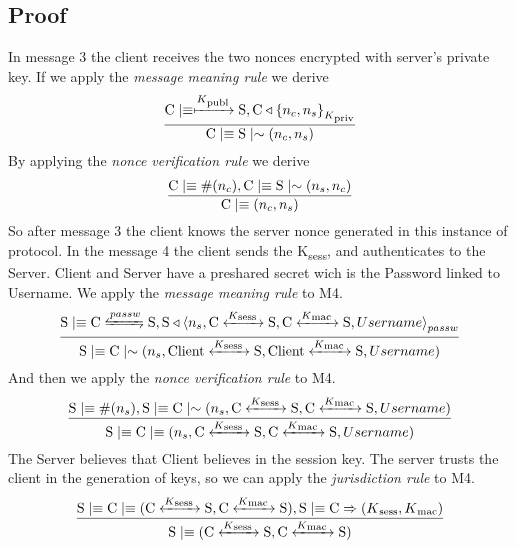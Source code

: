 \subsection{Proof}
In message 3 the client receives the two nonces encrypted with server's private key. If we apply the \textit{message meaning rule} we derive
\[ \frac{\textnormal{C} \mid\equiv \xmapsto{K\textsubscript{publ}} \textnormal{S}, \textnormal{C} \triangleleft { \{ n_c,n_s \} }_{K\textsubscript{priv}}}
        {\textnormal{C} \mid\equiv \textnormal{S} \mid\sim (n_c,n_s)}\]
By applying the \textit{nonce verification rule} we derive
\[ \frac{\textnormal{C} \mid\equiv \#(n_c), \textnormal{C} \mid\equiv \textnormal{S} \mid\sim (n_s,n_c)}{\textnormal{C} \mid\equiv (n_c,n_s)}\]
So after message 3 the client knows the server nonce generated in this instance of protocol. In the message 4 the client sends the K\textsubscript{sess}, and authenticates to the Server. Client and Server have a preshared secret wich is the Password linked to Username. We apply the \textit{message meaning rule} to M4.
\[ \frac{\textnormal{S} \believes \textnormal{C} \secret{passw} \textnormal{S}, \textnormal{S} \sees \combine{n_s,\textnormal{C} \sharekey{K\textsubscript{sess }} \textnormal{S},\textnormal{C} \sharekey{K\textsubscript{mac }} \textnormal{S},Username}{passw}}{\textnormal{S}\believes \textnormal{C} \oncesaid (n_s,\textnormal{Client} \sharekey{K\textsubscript{sess }} \textnormal{S},\textnormal{Client} \sharekey{K\textsubscript{mac }} \textnormal{S},Username)} \]
And then we apply the \textit{nonce verification rule} to M4.
\[ \frac{\textnormal{S}\mid\equiv \#(n_s), \textnormal{S} \mid\equiv \textnormal{C} \mid\sim (n_s,\textnormal{C} \xleftrightarrow{K\textsubscript{sess }} \textnormal{S},\textnormal{C} \xleftrightarrow{K\textsubscript{mac }} \textnormal{S},Username)}
   {\textnormal{S} \mid\equiv \textnormal{C} \mid\equiv (n_s,\textnormal{C} \xleftrightarrow{K\textsubscript{sess }} \textnormal{S},\textnormal{C} \xleftrightarrow{K\textsubscript{mac }} \textnormal{S},Username)}	\]
The Server believes that Client believes in the session key. The server trusts the client in the generation of keys, so we can apply the \textit{jurisdiction rule} to M4.
\[ \frac{\textnormal{S} \mid\equiv \textnormal{C} \mid\equiv (\textnormal{C} \xleftrightarrow{K\textsubscript{sess }} \textnormal{S},\textnormal{C} \xleftrightarrow{K\textsubscript{mac }} \textnormal{S}), \textnormal{S} \mid\equiv \textnormal{C} \Rightarrow (K\textsubscript{sess},K\textsubscript{mac})}
        {\textnormal{S} \mid\equiv (\textnormal{C} \xleftrightarrow{K\textsubscript{sess }} \textnormal{S},\textnormal{C} \xleftrightarrow{K\textsubscript{mac }} \textnormal{S}) } \]
